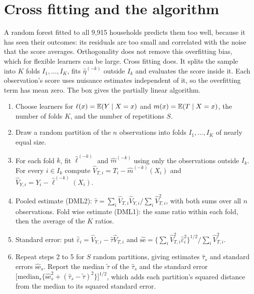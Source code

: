 \section{Cross fitting and the algorithm}\label{sec:dml:cf}

A random forest fitted to all 9,915 households predicts them too well, because it has seen their outcomes: its residuals are too small and correlated with the noise that the score averages. Orthogonality does not remove this overfitting bias, which for flexible learners can be large. Cross fitting does. It splits the sample into $K$ folds $I_1, \dots, I_K$, fits $\hat\eta^{(-k)}$ outside $I_k$ and evaluates the score inside it. Each observation's score uses nuisance estimates independent of it, so the overfitting term has mean zero. The box gives the partially linear algorithm.

\begin{tcolorbox}[colback=gray!6,colframe=gray!50,title=Algorithm: cross fitted DML in the partially linear model,fonttitle=\normalfont\itshape,coltitle=black,colbacktitle=gray!15,boxrule=0.4pt,arc=1pt]
\begin{enumerate}[leftmargin=*,itemsep=2pt,topsep=2pt]
\item Choose learners for $\ell(x) = \mathbb{E}(Y \mid X = x)$ and $m(x) = \mathbb{E}(T \mid X = x)$, the number of folds $K$, and the number of repetitions $S$.
\item Draw a random partition of the $n$ observations into folds $I_1, \dots, I_K$ of nearly equal size.
\item For each fold $k$, fit $\hat\ell^{(-k)}$ and $\hat m^{(-k)}$ using only the observations outside $I_k$. For every $i \in I_k$ compute $\hat V_{T,i} = T_i - \hat m^{(-k)}(X_i)$ and $\hat V_{Y,i} = Y_i - \hat\ell^{(-k)}(X_i)$.
\item Pooled estimate (DML2): $\hat\tau = \sum_i \hat V_{T,i}\hat V_{Y,i} \big/ \sum_i \hat V_{T,i}^2$, with both sums over all $n$ observations. Fold wise estimate (DML1): the same ratio within each fold, then the average of the $K$ ratios.
\item Standard error: put $\hat\varepsilon_i = \hat V_{Y,i} - \hat\tau\hat V_{T,i}$ and $\widehat{\mathrm{se}} = \bigl\{\sum_i \hat V_{T,i}^2\hat\varepsilon_i^2\bigr\}^{1/2} \big/ \sum_i \hat V_{T,i}^2$.
\item Repeat steps 2 to 5 for $S$ random partitions, giving estimates $\hat\tau_s$ and standard errors $\widehat{\mathrm{se}}_s$. Report the median $\tilde\tau$ of the $\hat\tau_s$ and the standard error $\bigl[\mathrm{median}_s\{\widehat{\mathrm{se}}_s^2 + (\hat\tau_s - \tilde\tau)^2\}\bigr]^{1/2}$, which adds each partition's squared distance from the median to its squared standard error.
\end{enumerate}
\end{tcolorbox}

